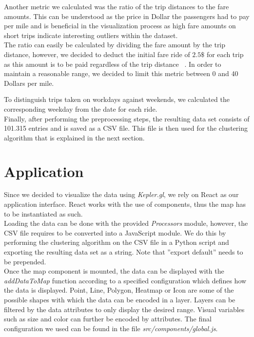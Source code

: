 \documentclass[sigconf, authorversion, nonacm=true]{acmart}
\begin{document}
Another metric we calculated was the ratio of the trip distances to the fare amounts. This can be understood as the price in Dollar the passengers had to pay per mile and is beneficial in the visualization process as high fare amounts on short trips indicate interesting outliers within the dataset.\\
The ratio can easily be calculated by dividing the fare amount by the trip distance, however, we decided to deduct the initial fare ride of $2.5\$$ for each trip as this amount is to be paid regardless of the trip distance ~\citep{fareamount}. In order to maintain a reasonable range, we decided to limit this metric between 0 and 40 Dollars per mile.



To distinguish trips taken on workdays against weekends, we calculated the corresponding weekday from the date for each ride.\\


Finally, after performing the preprocessing steps, the resulting data set consists of 101.315 entries and is saved as a CSV file. This file is then used for the clustering algorithm that is explained in the next section.




\section{Application}
\label{sec:app}

Since we decided to visualize the data using \textit{Kepler.gl}, we rely on React as our application interface. React works with the use of components, thus the map has to be instantiated as such.\\
Loading the data can be done with the provided \textit{Processors} module, however, the CSV file requires to be converted into a JavaScript module. We do this by performing the clustering algorithm on the CSV file in a Python script and exporting the resulting data set as a string. Note that ''export default'' needs to be prepended.\\

Once the map component is mounted, the data can be displayed with the \textit{addDataToMap} function according to a specified configuration which defines how the data is displayed. 
Point, Line, Polygon, Heatmap or Icon are some of the possible shapes with which the data can be encoded in a layer. Layers can be filtered by the data attributes to only display the desired range. Visual variables such as size and color can further be encoded by attributes.
The final configuration we used can be found in the file \textit{src/components/global.js}.\\
\end{document}
